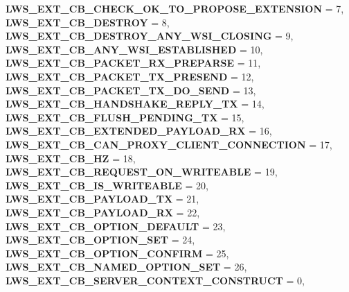 \begin{DoxyCompactItemize}
{\bfseries L\+W\+S\+\_\+\+E\+X\+T\+\_\+\+C\+B\+\_\+\+C\+H\+E\+C\+K\+\_\+\+O\+K\+\_\+\+T\+O\+\_\+\+P\+R\+O\+P\+O\+S\+E\+\_\+\+E\+X\+T\+E\+N\+S\+I\+ON} = 7, 
\newline
{\bfseries L\+W\+S\+\_\+\+E\+X\+T\+\_\+\+C\+B\+\_\+\+D\+E\+S\+T\+R\+OY} = 8, 
{\bfseries L\+W\+S\+\_\+\+E\+X\+T\+\_\+\+C\+B\+\_\+\+D\+E\+S\+T\+R\+O\+Y\+\_\+\+A\+N\+Y\+\_\+\+W\+S\+I\+\_\+\+C\+L\+O\+S\+I\+NG} = 9, 
{\bfseries L\+W\+S\+\_\+\+E\+X\+T\+\_\+\+C\+B\+\_\+\+A\+N\+Y\+\_\+\+W\+S\+I\+\_\+\+E\+S\+T\+A\+B\+L\+I\+S\+H\+ED} = 10, 
{\bfseries L\+W\+S\+\_\+\+E\+X\+T\+\_\+\+C\+B\+\_\+\+P\+A\+C\+K\+E\+T\+\_\+\+R\+X\+\_\+\+P\+R\+E\+P\+A\+R\+SE} = 11, 
\newline
{\bfseries L\+W\+S\+\_\+\+E\+X\+T\+\_\+\+C\+B\+\_\+\+P\+A\+C\+K\+E\+T\+\_\+\+T\+X\+\_\+\+P\+R\+E\+S\+E\+ND} = 12, 
{\bfseries L\+W\+S\+\_\+\+E\+X\+T\+\_\+\+C\+B\+\_\+\+P\+A\+C\+K\+E\+T\+\_\+\+T\+X\+\_\+\+D\+O\+\_\+\+S\+E\+ND} = 13, 
{\bfseries L\+W\+S\+\_\+\+E\+X\+T\+\_\+\+C\+B\+\_\+\+H\+A\+N\+D\+S\+H\+A\+K\+E\+\_\+\+R\+E\+P\+L\+Y\+\_\+\+TX} = 14, 
{\bfseries L\+W\+S\+\_\+\+E\+X\+T\+\_\+\+C\+B\+\_\+\+F\+L\+U\+S\+H\+\_\+\+P\+E\+N\+D\+I\+N\+G\+\_\+\+TX} = 15, 
\newline
{\bfseries L\+W\+S\+\_\+\+E\+X\+T\+\_\+\+C\+B\+\_\+\+E\+X\+T\+E\+N\+D\+E\+D\+\_\+\+P\+A\+Y\+L\+O\+A\+D\+\_\+\+RX} = 16, 
{\bfseries L\+W\+S\+\_\+\+E\+X\+T\+\_\+\+C\+B\+\_\+\+C\+A\+N\+\_\+\+P\+R\+O\+X\+Y\+\_\+\+C\+L\+I\+E\+N\+T\+\_\+\+C\+O\+N\+N\+E\+C\+T\+I\+ON} = 17, 
{\bfseries L\+W\+S\+\_\+\+E\+X\+T\+\_\+\+C\+B\+\_\+HZ} = 18, 
{\bfseries L\+W\+S\+\_\+\+E\+X\+T\+\_\+\+C\+B\+\_\+\+R\+E\+Q\+U\+E\+S\+T\+\_\+\+O\+N\+\_\+\+W\+R\+I\+T\+E\+A\+B\+LE} = 19, 
\newline
{\bfseries L\+W\+S\+\_\+\+E\+X\+T\+\_\+\+C\+B\+\_\+\+I\+S\+\_\+\+W\+R\+I\+T\+E\+A\+B\+LE} = 20, 
{\bfseries L\+W\+S\+\_\+\+E\+X\+T\+\_\+\+C\+B\+\_\+\+P\+A\+Y\+L\+O\+A\+D\+\_\+\+TX} = 21, 
{\bfseries L\+W\+S\+\_\+\+E\+X\+T\+\_\+\+C\+B\+\_\+\+P\+A\+Y\+L\+O\+A\+D\+\_\+\+RX} = 22, 
{\bfseries L\+W\+S\+\_\+\+E\+X\+T\+\_\+\+C\+B\+\_\+\+O\+P\+T\+I\+O\+N\+\_\+\+D\+E\+F\+A\+U\+LT} = 23, 
\newline
{\bfseries L\+W\+S\+\_\+\+E\+X\+T\+\_\+\+C\+B\+\_\+\+O\+P\+T\+I\+O\+N\+\_\+\+S\+ET} = 24, 
{\bfseries L\+W\+S\+\_\+\+E\+X\+T\+\_\+\+C\+B\+\_\+\+O\+P\+T\+I\+O\+N\+\_\+\+C\+O\+N\+F\+I\+RM} = 25, 
{\bfseries L\+W\+S\+\_\+\+E\+X\+T\+\_\+\+C\+B\+\_\+\+N\+A\+M\+E\+D\+\_\+\+O\+P\+T\+I\+O\+N\+\_\+\+S\+ET} = 26, 
{\bfseries L\+W\+S\+\_\+\+E\+X\+T\+\_\+\+C\+B\+\_\+\+S\+E\+R\+V\+E\+R\+\_\+\+C\+O\+N\+T\+E\+X\+T\+\_\+\+C\+O\+N\+S\+T\+R\+U\+CT} = 0, 
\newline

\end{DoxyCompactItemize}
